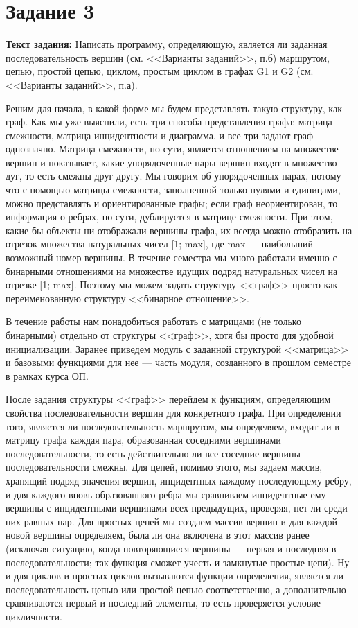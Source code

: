 \documentclass[12pt]{article}
\begin{document}
	\section{Задание 3}
	\label{task3}

	{\bf Текст задания:} Написать программу, определяющую, является ли заданная последовательность вершин (см. <<Варианты заданий>>, п.б) маршрутом, цепью, простой цепью, циклом, простым циклом в графах G1 и G2 (см. <<Варианты заданий>>, п.а). 
	
	Решим для начала, в какой форме мы будем представлять такую структуру, как граф. Как мы уже выяснили, есть три способа представления графа: матрица смежности, матрица инцидентности и диаграмма, и все три задают граф однозначно. Матрица смежности, по сути, является отношением на множестве вершин и показывает, какие упорядоченные пары вершин входят в множество дуг, то есть смежны друг другу. Мы говорим об упорядоченных парах, потому что с помощью матрицы смежности, заполненной только нулями и единицами, можно представлять и ориентированные графы; если граф неориентирован, то информация о ребрах, по сути, дублируется в матрице смежности. При этом, какие бы объекты ни отображали вершины графа, их всегда можно отобразить на отрезок множества натуральных чисел [1; max], где max --- наибольший возможный номер вершины. В течение семестра мы много работали именно с бинарными отношениями на множестве идущих подряд натуральных чисел на отрезке [1; max]. Поэтому мы можем задать структуру <<граф>> просто как переименованную структуру <<бинарное отношение>>.
	
	В течение работы нам понадобиться работать с матрицами (не только бинарными) отдельно от структуры <<граф>>, хотя бы просто для удобной инициализации. Заранее приведем модуль с заданной структурой <<матрица>> и базовыми функциями для нее --- часть модуля, созданного в прошлом семестре в рамках курса ОП.
	
	 
	 
	
	После задания структуры <<граф>> перейдем к функциям, определяющим свойства последовательности вершин для конкретного графа. При определении того, является ли последовательность маршрутом, мы определяем, входит ли в матрицу графа каждая пара, образованная соседними вершинами последовательности, то есть действительно ли все соседние вершины последовательности смежны. Для цепей, помимо этого, мы задаем массив, хранящий подряд значения вершин, инцидентных каждому последующему ребру, и для каждого вновь образованного ребра мы сравниваем инцидентные ему вершины с инцидентными вершинами всех предыдущих, проверяя, нет ли среди них равных пар. Для простых цепей мы создаем массив вершин и для каждой новой вершины определяем, была ли она включена в этот массив ранее (исключая ситуацию, когда повторяющиеся вершины --- первая и последняя в последовательности; так функция сможет учесть и замкнутые простые цепи). Ну и для циклов и простых циклов вызываются функции определения, является ли последовательность цепью или простой цепью соответственно, а дополнительно сравниваются первый и последний элементы, то есть проверяется условие цикличности.
	
\end{document}
